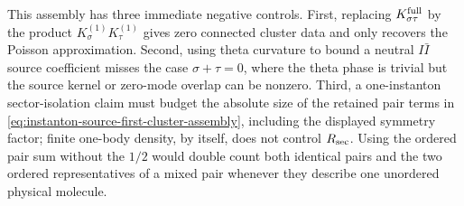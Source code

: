 \begin{controlledapproximation}
This assembly has three immediate negative controls.  First, replacing
\(K_{\sigma\tau}^{\rm full}\) by the product
\(K_{\sigma}^{(1)}K_{\tau}^{(1)}\) gives zero connected cluster data and only
recovers the Poisson approximation.  Second, using theta curvature to bound a
neutral \(I\bar I\) source coefficient misses the case
\(\sigma+\tau=0\), where the theta phase is trivial but the source kernel or
zero-mode overlap can be nonzero.  Third, a one-instanton sector-isolation
claim must budget the absolute size of the retained pair terms in
\eqref{eq:instanton-source-first-cluster-assembly}, including the displayed
symmetry factor; finite one-body density, by itself, does not control
\(R_{\rm sec}\).  Using the ordered pair sum without the \(1/2\) would double
count both identical pairs and the two ordered representatives of a mixed pair
whenever they describe one unordered physical molecule.
\end{controlledapproximation}

